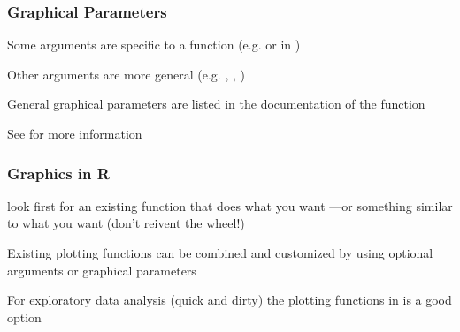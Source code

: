 \documentclass[12pt]{beamer}\usepackage[]{graphicx}\usepackage[]{color}
\begin{document}

\begin{frame}
\frametitle{Graphical Parameters}

\bi
  \item Some arguments are specific to a function (e.g.  or  in )
  \item Other arguments are more general (e.g. , , )
  \item General graphical parameters are listed in the documentation of the function {\hilit {}}
  \item See  for more information
\ei
\eb

\end{frame}


\begin{frame}
\frametitle{Graphics in R}

\bi
  \item look first for an existing function that does what you want ---or something similar to what you want (don't reivent the wheel!)
  \item Existing plotting functions can be combined and customized by using optional arguments or graphical parameters
  \item For exploratory data analysis (quick and dirty) the plotting functions in  is a good option
\ei
\eb

\end{frame}

\end{document}
